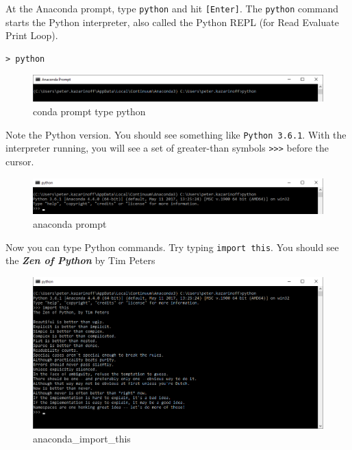 \documentclass{book}
\makeatletter
\def\maxwidth{\ifdim\Gin@nat@width>\linewidth\linewidth
    \else\Gin@nat@width\fi}
\let\Oldincludegraphics\includegraphics
\renewcommand{\includegraphics}[1]{\Oldincludegraphics[width=.8\maxwidth]{#1}}
\makeatother
\begin{document}
At the Anaconda prompt, type \lstinline!python! and hit
\lstinline![Enter]!. The \lstinline!python! command starts the Python
interpreter, also called the Python REPL (for Read Evaluate Print Loop).

\begin{lstlisting}
> python
\end{lstlisting}

\begin{figure}
\centering
\includegraphics{images/conda_prompt_type_python.png}
\caption{conda prompt type python}
\end{figure}

Note the Python version. You should see something like
\lstinline!Python 3.6.1!. With the interpreter running, you will see a
set of greater-than symbols \lstinline!>>>! before the cursor.

\begin{figure}
\centering
\includegraphics{images/conda_type_python.png}
\caption{anaconda prompt}
\end{figure}

Now you can type Python commands. Try typing \lstinline!import this!.
You should see the \textbf{\emph{Zen of Python}} by Tim Peters

\begin{figure}
\centering
\includegraphics{images/conda_import_this_output.png}
\caption{anaconda\_import\_this}
\end{figure}
\end{document}
